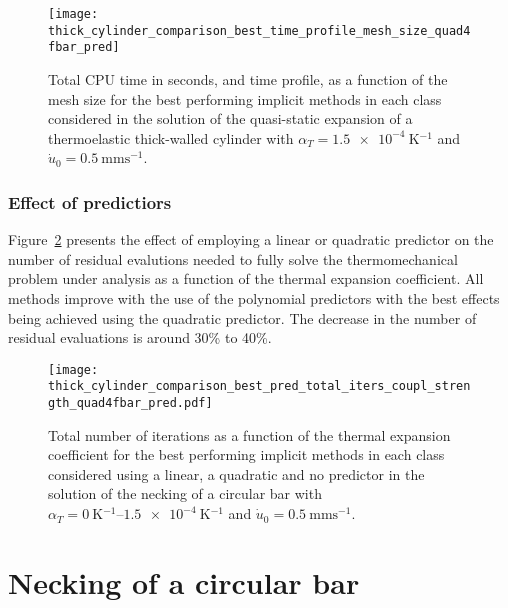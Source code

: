 \begin{figure}[hbtp]
  \centering
  \texttt{[image: thick\_cylinder\_comparison\_best\_time\_profile\_mesh\_size\_quad4fbar\_pred]}
  \caption{Total CPU time in seconds, and time profile, as a function of the mesh size for the  best performing implicit methods in each class considered in the solution of the quasi-static expansion of a thermoelastic thick-walled cylinder with \(\alpha_T=\SI{1.5e-4}{\kelvin^{-1}}\) and \(\dot u_0 =\SI{0.5}{\milli\meter\second^{-1}}\).}
\label{fig:thick_cylinder_comparison_best_time_profile_mesh_size_quad4fbar_pred}
\end{figure}

\FloatBarrier

\subsubsection{Effect of predictiors}

Figure~\ref{fig:thick_cylinder_comparison_best_pred_total_iters_coupl_strength_quad4fbar_pred.pdf} presents the effect of employing a linear or quadratic predictor on the number of residual evalutions needed to fully solve the thermomechanical problem under analysis as a function of the thermal expansion coefficient.
All methods improve with the use of the polynomial predictors with the best effects being achieved using the quadratic predictor.
The decrease in the number of residual evaluations is around 30\% to 40\%.


\begin{figure}[hbtp]
  \centering
  \texttt{[image: thick\_cylinder\_comparison\_best\_pred\_total\_iters\_coupl\_strength\_quad4fbar\_pred.pdf]}
  \caption{Total number of iterations as a function of the thermal expansion coefficient for the  best performing implicit methods in each class considered using a linear, a quadratic and no predictor in the solution of the necking of a circular bar with \(\alpha_T=\SIrange{0}{1.5e-4}{\kelvin^{-1}}\) and \(\dot u_0 =\SI{0.5}{\milli\meter\second^{-1}}\).}
\label{fig:thick_cylinder_comparison_best_pred_total_iters_coupl_strength_quad4fbar_pred.pdf}
\end{figure}

\FloatBarrier

\pagebreak

\section{Necking of a circular bar}
\label{sec:mech-driv-probl}


